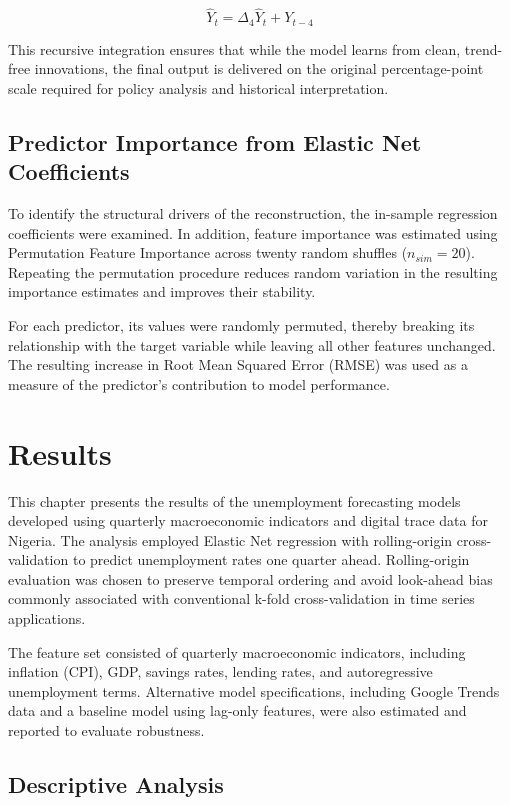 \documentclass[
  letterpaper,
  DIV=11,
  numbers=noendperiod]{scrartcl}
\begin{document}
\[\hat{Y}_t = \Delta_4 \hat{Y}_t + Y_{t-4}\]

This recursive integration ensures that while the model learns from
clean, trend-free innovations, the final output is delivered on the
original percentage-point scale required for policy analysis and
historical interpretation.

\subsection{Predictor Importance from Elastic Net
Coefficients}\label{predictor-importance-from-elastic-net-coefficients}

To identify the structural drivers of the reconstruction, the in-sample
regression coefficients were examined. In addition, feature importance
was estimated using Permutation Feature Importance across twenty random
shuffles (\(n_{sim}=20\)). Repeating the permutation procedure reduces
random variation in the resulting importance estimates and improves
their stability.

For each predictor, its values were randomly permuted, thereby breaking
its relationship with the target variable while leaving all other
features unchanged. The resulting increase in Root Mean Squared Error
(RMSE) was used as a measure of the predictor's contribution to model
performance.

\section{Results}\label{results}

This chapter presents the results of the unemployment forecasting models
developed using quarterly macroeconomic indicators and digital trace
data for Nigeria. The analysis employed Elastic Net regression with
rolling-origin cross-validation to predict unemployment rates one
quarter ahead. Rolling-origin evaluation was chosen to preserve temporal
ordering and avoid look-ahead bias commonly associated with conventional
k-fold cross-validation in time series applications.

The feature set consisted of quarterly macroeconomic indicators,
including inflation (CPI), GDP, savings rates, lending rates, and
autoregressive unemployment terms. Alternative model specifications,
including Google Trends data and a baseline model using lag-only
features, were also estimated and reported to evaluate robustness.

\subsection{Descriptive Analysis}\label{descriptive-analysis}
\end{document}
